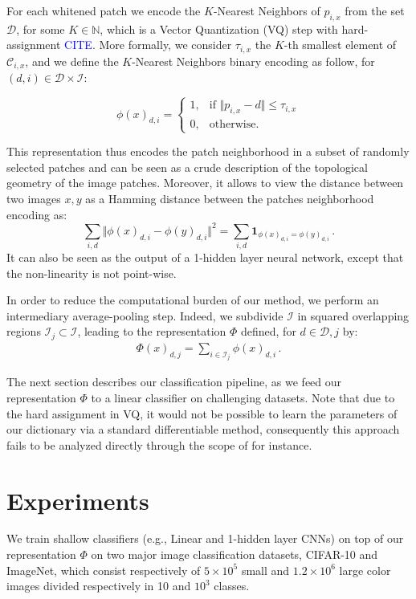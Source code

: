 \documentclass{article}
\newcommand{\Edouard}[1]{\textcolor{blue}{#1}}
\begin{document}
 
For each whitened patch we encode the $K$-Nearest Neighbors of $p_{i,x}$ from the set $\mathcal{D}$, for some $ K \in \mathbb{N}$, which is a Vector Quantization (VQ) step with hard-assignment \Edouard{CITE}.
More formally, we consider $\tau_{i,x}$ the $K$-th smallest  element of $\mathcal{C}_{i,x}$, and we define the $K$-Nearest Neighbors binary encoding as follow, for  $(d,i)\in\mathcal{D}\times\mathcal{I}$:
   

\begin{equation}
\label{encoding}
\phi(x)_{d,i}=
\begin{cases}
1,&\text{if } \Vert  p_{i,x} - d\Vert \leq \tau_{i,x}\\
0,&\text{otherwise}.
\end{cases}
\end{equation}


This representation thus encodes the patch neighborhood in a subset of randomly selected patches and can be seen as a crude description of the topological geometry of the image patches.
Moreover, it allows to view the distance between two images $x,y$ as a Hamming distance between the patches neighborhood encoding as:
\[\sum_{i,d}\Vert \phi(x)_{d,i}-\phi(y)_{d,i}\Vert^2=\sum_{i,d}\mathbf{1}_{\phi(x)_{d,i}=\phi(y)_{d,i}}\,.\]
It can also be seen as the output of a 1-hidden layer neural network, except that the non-linearity is not point-wise.

In order to reduce the computational burden of our method, we perform an intermediary average-pooling step.
Indeed, we subdivide $\mathcal{I}$ in squared overlapping regions $\mathcal{I}_j\subset\mathcal{I}$, leading to the representation $\Phi$ defined, for $d\in\mathcal{D}, j$ by:
\begin{align}\Phi(x)_{d,j}= \sum_{i\in \mathcal{I}_j}\phi(x)_{d,i}\,.\end{align}

The next section describes our classification pipeline, as we feed our representation $\Phi$ to a linear classifier on challenging datasets.
Note that due to the hard assignment  in VQ, it would not be possible to learn the parameters of our dictionary via a standard differentiable method, consequently this approach fails to be analyzed directly through the scope of \cite{chizat2018global} for instance.




\section{Experiments}
\label{experiments}
We train  shallow classifiers (e.g., Linear and 1-hidden layer CNNs) on top of our representation $\Phi$ on two major  image classification datasets,  CIFAR-10 and ImageNet, which consist respectively of $5\times10^5$ small and $1.2\times10^6$ large color images  divided respectively in 10 and $10^3$ classes.
\end{document}
